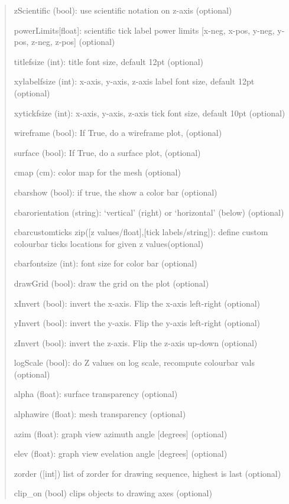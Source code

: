 \documentclass[a4paper,10pt,english]{sphinxmanual}
\begin{document}
\begin{fulllineitems}
\begin{fulllineitems}
\begin{quote}
\begin{description}
\begin{DUlineblock}{0em}
\item[] zScientific (bool): use scientific notation on z-axis (optional)
\item[] powerLimits{[}float{]}:  scientific tick label power limits {[}x-neg, x-pos, y-neg, y-pos, z-neg, z-pos{]}  (optional)
\item[] titlefsize (int): title font size, default 12pt (optional)
\item[] xylabelfsize (int): x-axis, y-axis, z-axis label font size, default 12pt (optional)
\item[] xytickfsize (int): x-axis, y-axis, z-axis tick font size, default 10pt (optional)
\item[] wireframe (bool): If True, do a wireframe plot,  (optional)
\item[] surface (bool): If True, do a surface plot,  (optional)
\item[] cmap (cm): color map for the mesh (optional)
\item[] cbarshow (bool): if true, the show a color bar (optional)
\item[] cbarorientation (string): `vertical' (right) or `horizontal' (below) (optional)
\item[] cbarcustomticks zip({[}z values/float{]},{[}tick labels/string{]}):  define custom colourbar ticks locations for given z values(optional)
\item[] cbarfontsize (int): font size for color bar (optional)
\item[] drawGrid (bool): draw the grid on the plot (optional)
\item[] xInvert (bool): invert the x-axis. Flip the x-axis left-right (optional)
\item[] yInvert (bool): invert the y-axis. Flip the y-axis left-right (optional)
\item[] zInvert (bool): invert the z-axis. Flip the z-axis up-down (optional)
\item[] logScale (bool): do Z values on log scale, recompute colourbar vals (optional)
\item[] alpha (float): surface transparency (optional)
\item[] alphawire (float): mesh transparency (optional)
\item[] azim (float): graph view azimuth angle  {[}degrees{]} (optional)
\item[] elev (float): graph view evelation angle  {[}degrees{]} (optional)
\item[] zorder ({[}int{]}) list of zorder for drawing sequence, highest is last (optional)
\item[] clip\_on (bool) clips objects to drawing axes (optional)
\end{DUlineblock}


\end{description}
\end{quote}
\end{fulllineitems}
\end{fulllineitems}
\end{document}
